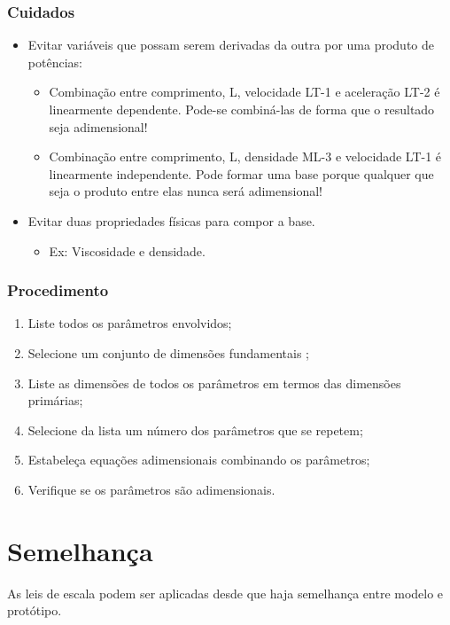 \documentclass[a4paper, 12pt]{article}
\begin{document}
\subsubsection{Cuidados}
	\begin{itemize}
		\item Evitar variáveis que possam serem derivadas da outra por uma produto de potências:
			\begin{itemize}
				\item Combinação entre comprimento, L, velocidade LT-1 e aceleração LT-2 é linearmente dependente.
				Pode-se combiná-las de forma que o resultado seja adimensional!
				\item Combinação entre comprimento, L, densidade ML-3 e velocidade LT-1 é linearmente independente.
				Pode formar uma base porque qualquer que seja o produto entre elas nunca será adimensional!
			\end{itemize}
		
		\item Evitar duas propriedades físicas para compor a base.
			\begin{itemize}
				\item Ex: Viscosidade e densidade.
			\end{itemize}
	\end{itemize}

\subsubsection{Procedimento}
	\begin{enumerate}
		\item Liste todos os parâmetros envolvidos;
		\item Selecione um conjunto de dimensões fundamentais ;
		\item Liste as dimensões de todos os parâmetros em termos das dimensões primárias;
		\item Selecione da lista um número dos parâmetros que se repetem;
		\item Estabeleça equações adimensionais combinando os parâmetros;
		\item Verifique se os parâmetros são adimensionais.
	\end{enumerate}

\section{Semelhança}
	As leis de escala podem ser aplicadas desde que haja semelhança entre modelo e protótipo.\\
	
\end{document}
